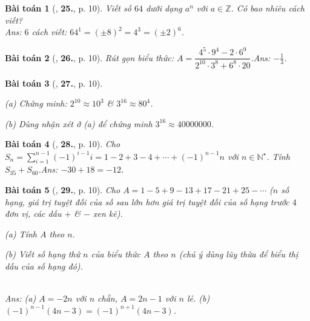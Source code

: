 \documentclass{article}
\numberwithin{equation}{section}
\newtheorem{baitoan}{Bài toán}
\begin{document}
\begin{baitoan}[\cite{Binh_Toan_7_tap_1}, \textbf{25.}, p. 10]
	Viết số $64$ dưới dạng $a^n$ với $a\in\mathbb{Z}$. Có bao nhiêu cách viết?\\\mbox{}\hfill\textsf{Ans:} $6$ cách viết: $64^1 = (\pm8)^2 = 4^3 = (\pm2)^6$.
\end{baitoan}

\begin{baitoan}[\cite{Binh_Toan_7_tap_1}, \textbf{26.}, p. 10]
	Rút gọn biểu thức: $A = \dfrac{4^5\cdot 9^4 - 2\cdot 6^9}{2^{10}\cdot 3^8 + 6^8\cdot 20}$.\hfill\textsf{Ans:} $-\frac{1}{3}$.
\end{baitoan}

\begin{baitoan}[\cite{Binh_Toan_7_tap_1}, \textbf{27.}, p. 10]
	\begin{enumerate*}
		\item[(a)] Chứng minh: $2^{10}\approx 10^3$ \& $3^{16}\approx 80^4$.
		\item[(b)] Dùng nhận xét ở (a) để chứng minh $3^{16}\approx 40000000$.
	\end{enumerate*}
\end{baitoan}

\begin{baitoan}[\cite{Binh_Toan_7_tap_1}, \textbf{28.}, p. 10]
	Cho $S_n = \sum_{i=1}^{n-1} (-1)^{i-1}i = 1 - 2 + 3 - 4 + \cdots + (-1)^{n-1}n$ với $n\in\mathbb{N}^\star$. Tính $S_{35} + S_{60}$.\hfill\textsf{Ans:} $-30 + 18 = -12$.
\end{baitoan}

\begin{baitoan}[\cite{Binh_Toan_7_tap_1}, \textbf{29.}, p. 10]
	Cho $A = 1 - 5 + 9 - 13 + 17 - 21 + 25 - \cdots$ ($n$ số hạng, giá trị tuyệt đối của số sau lớn hơn giá trị tuyệt đối của số hạng trước $4$ đơn vị, các dấu $+$ \& $-$ xen kẽ).
	\begin{enumerate*}
		\item[(a)] Tính $A$ theo $n$.
		\item[(b)] Viết số hạng thứ $n$ của biểu thức $A$ theo $n$ (chú ý dùng lũy thừa để biểu thị dấu của số hạng đó).
	\end{enumerate*}\\\mbox{}\hfill\textsf{Ans:} (a) $A = -2n$ với $n$ chẵn, $A = 2n - 1$ với $n$ lẻ. (b) $(-1)^{n-1}(4n - 3) = (-1)^{n+1}(4n - 3)$.
\end{baitoan}
\end{document}
